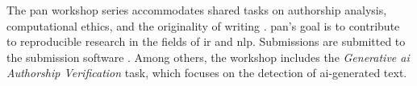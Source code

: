 The \ac{pan} workshop series accommodates shared tasks %
on authorship analysis, computational ethics, and the originality of writing \cite{zangerle_overview_nodate}.
\ac{pan}'s goal is to contribute to reproducible research in the fields of \ac{ir} and \ac{nlp}.
Submissions are submitted to the submission software \tira{}.
Among others, the workshop includes the \textit{Generative \ac{ai} Authorship Verification} task, which focuses on the detection of \ac{ai}-generated text.
